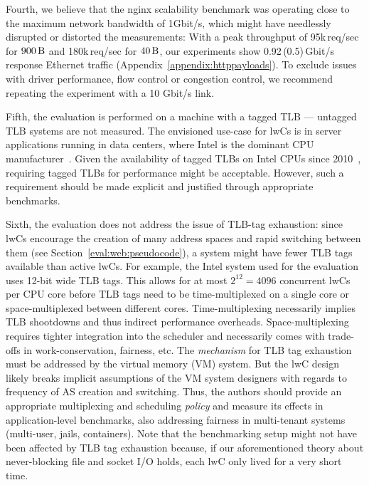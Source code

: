 \documentclass[10pt,twocolumn,a4paper]{article}
\begin{document}
Fourth, we believe that the nginx scalability benchmark was operating close to the maximum network bandwidth of 1Gbit/s, which might have needlessly disrupted or distorted the measurements:
With a peak throughput of 95k\,req/sec for $\SI{900}{\byte}$ and 180k\,req/sec for $\SI{40}{\byte}$, our experiments show 0.92\,(0.5)\,Gbit/s response Ethernet traffic (Appendix~\ref{appendix:httppayloads}).
To exclude issues with driver performance, flow control or congestion control, we recommend repeating the experiment with a 10 Gbit/s link.

Fifth, the evaluation is performed on a machine with a tagged TLB --- untagged TLB systems are not measured.
The envisioned use-case for lwCs is in server applications running in data centers, where Intel is the dominant CPU manufacturer~\cite{intelmarketshare}.
Given the availability of tagged TLBs on Intel CPUs since 2010~\cite{westmerearrives}, requiring tagged TLBs for performance might be acceptable.
However, such a requirement should be made explicit and justified through appropriate benchmarks.

Sixth, the evaluation does not address the issue of TLB-tag exhaustion:
since lwCs encourage the creation of many address spaces and rapid switching between them (see Section~\ref{eval:web:pseudocode}), a system might have fewer TLB tags available than active lwCs.
For example, the Intel system used for the evaluation uses 12-bit wide TLB tags.\cite{intelsdmpcids}
This allows for at most $2^{12}=4096$ concurrent lwCs per CPU core before TLB tags need to be time-multiplexed on a single core or space-multiplexed between different cores.
Time-multiplexing necessarily implies TLB shootdowns and thus indirect performance overheads.
Space-multiplexing requires tighter integration into the scheduler and necessarily comes with trade-offs in work-conservation, fairness, etc.
The \textit{mechanism} for TLB tag exhaustion must be addressed by the virtual memory (VM) system.
But the lwC design likely breaks implicit assumptions of the VM system designers with regards to frequency of AS creation and switching.
Thus, the authors should provide an appropriate multiplexing and scheduling \textit{policy} and measure its effects in application-level benchmarks, also addressing fairness in multi-tenant systems (multi-user, jails, containers).
Note that the benchmarking setup might not have been affected by TLB tag exhaustion because, if our aforementioned theory about never-blocking file and socket I/O holds, each lwC only lived for a very short time.
\end{document}
